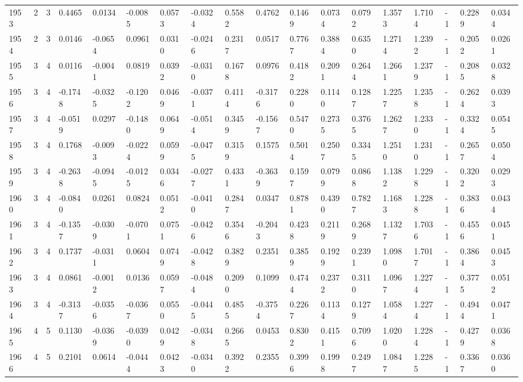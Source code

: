 \begin{tabular}{llllllllllllllllll}
1953 & 2 & 3 & 0.4465 & 0.0134 & -0.0085 & 0.0573 & -0.0324 & 0.5582 & 0.4762 & 0.1469 & 0.0734 & 0.0792 & 1.3573 & 1.7104 & -1 & 0.2289 & 0.0344 \\
1954 & 2 & 3 & 0.0146 & -0.0654 & 0.0961 & 0.0310 & -0.0246 & 0.2317 & 0.0517 & 0.7767 & 0.3884 & 0.6350 & 1.2714 & 1.2392 & -1 & 0.2052 & 0.0261 \\
1955 & 3 & 4 & 0.0116 & -0.0041 & 0.0819 & 0.0392 & -0.0310 & 0.1678 & 0.0976 & 0.4182 & 0.2091 & 0.2644 & 1.2661 & 1.2379 & -1 & 0.2085 & 0.0328 \\
1956 & 3 & 4 & -0.1748 & -0.0325 & -0.1202 & 0.0469 & -0.0371 & 0.4114 & -0.3176 & 0.2280 & 0.1140 & 0.1287 & 1.2257 & 1.2358 & -1 & 0.2624 & 0.0393 \\
1957 & 3 & 4 & -0.0519 & 0.0297 & -0.1480 & 0.0649 & -0.0514 & 0.3459 & -0.1567 & 0.5470 & 0.2735 & 0.3765 & 1.2627 & 1.2330 & -1 & 0.3324 & 0.0545 \\
1958 & 3 & 4 & 0.1768 & -0.0093 & -0.0224 & 0.0599 & -0.0475 & 0.3159 & 0.1575 & 0.5014 & 0.2507 & 0.3345 & 1.2510 & 1.2310 & -1 & 0.2657 & 0.0504 \\
1959 & 3 & 4 & -0.2638 & -0.0945 & -0.0125 & 0.0346 & -0.0277 & 0.4331 & -0.3639 & 0.1597 & 0.0799 & 0.0868 & 1.1382 & 1.2298 & -1 & 0.3202 & 0.0293 \\
1960 & 3 & 4 & -0.0840 & 0.0261 & 0.0824 & 0.0512 & -0.0410 & 0.2847 & 0.0347 & 0.8781 & 0.4390 & 0.7827 & 1.1683 & 1.2288 & -1 & 0.3836 & 0.0434 \\
1961 & 3 & 4 & -0.1357 & -0.0309 & -0.0701 & 0.0751 & -0.0426 & 0.3546 & -0.2043 & 0.4238 & 0.2119 & 0.2689 & 1.1327 & 1.7036 & -1 & 0.4556 & 0.0451 \\
1962 & 3 & 4 & 0.1737 & -0.0311 & 0.0604 & 0.0749 & -0.0428 & 0.3829 & 0.2351 & 0.3859 & 0.1929 & 0.2391 & 1.0980 & 1.7017 & -1 & 0.3864 & 0.0453 \\
1963 & 3 & 4 & 0.0861 & -0.0012 & 0.0136 & 0.0597 & -0.0484 & 0.2090 & 0.1099 & 0.4744 & 0.2372 & 0.3110 & 1.0967 & 1.2274 & -1 & 0.3775 & 0.0512 \\
1964 & 3 & 4 & -0.3137 & -0.0356 & -0.0367 & 0.0550 & -0.0445 & 0.4855 & -0.3754 & 0.2267 & 0.1134 & 0.1279 & 1.0584 & 1.2274 & -1 & 0.4944 & 0.0471 \\
1965 & 4 & 5 & 0.1130 & -0.0369 & -0.0390 & 0.0429 & -0.0348 & 0.2665 & 0.0453 & 0.8302 & 0.4151 & 0.7096 & 1.0200 & 1.2284 & -1 & 0.4279 & 0.0368 \\
1966 & 4 & 5 & 0.2101 & 0.0614 & -0.0444 & 0.0423 & -0.0340 & 0.3922 & 0.2355 & 0.3996 & 0.1998 & 0.2497 & 1.0847 & 1.2285 & -1 & 0.3367 & 0.0360 \\

\end{tabular}
